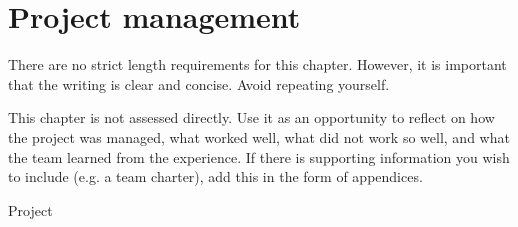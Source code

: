 \chapter{Project management}
\label{chap:project-management}


\begin{length}
There are no strict length requirements for this chapter.  However, it is important that the writing is clear and concise.  Avoid repeating yourself.  
\end{length}

\begin{expectations}
This chapter is not assessed directly.  Use it as an opportunity to reflect on how the project was managed, what worked well, what did not work so well, and what the team learned from the experience.  If there is supporting information you wish to include (e.g. a team charter), add this in the form of appendices.
\end{expectations}

Project